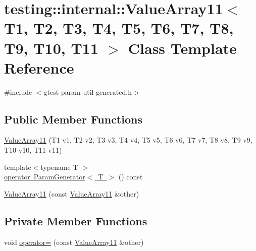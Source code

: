 \hypertarget{classtesting_1_1internal_1_1_value_array11}{}\section{testing\+::internal\+::Value\+Array11$<$ T1, T2, T3, T4, T5, T6, T7, T8, T9, T10, T11 $>$ Class Template Reference}
\label{classtesting_1_1internal_1_1_value_array11}


{\ttfamily \#include $<$gtest-\/param-\/util-\/generated.\+h$>$}

\subsection*{Public Member Functions}
\begin{DoxyCompactItemize}
\item 
\mbox{\hyperlink{classtesting_1_1internal_1_1_value_array11_a2b26f49e7c5856e86f4fae360cd22d47}{Value\+Array11}} (T1 v1, T2 v2, T3 v3, T4 v4, T5 v5, T6 v6, T7 v7, T8 v8, T9 v9, T10 v10, T11 v11)
\item 
{\footnotesize template$<$typename T $>$ }\\\mbox{\hyperlink{classtesting_1_1internal_1_1_value_array11_a3042498fcde8d1c91df474e618416f28}{operator Param\+Generator$<$ T $>$}} () const
\item 
\mbox{\hyperlink{classtesting_1_1internal_1_1_value_array11_a09b4890b05313d04d98cbb5507d9b34e}{Value\+Array11}} (const \mbox{\hyperlink{classtesting_1_1internal_1_1_value_array11}{Value\+Array11}} \&other)
\end{DoxyCompactItemize}
\subsection*{Private Member Functions}
\begin{DoxyCompactItemize}
\item 
void \mbox{\hyperlink{classtesting_1_1internal_1_1_value_array11_afc232625c281dbc693117775f76e6fa4}{operator=}} (const \mbox{\hyperlink{classtesting_1_1internal_1_1_value_array11}{Value\+Array11}} \&other)
\end{DoxyCompactItemize}
